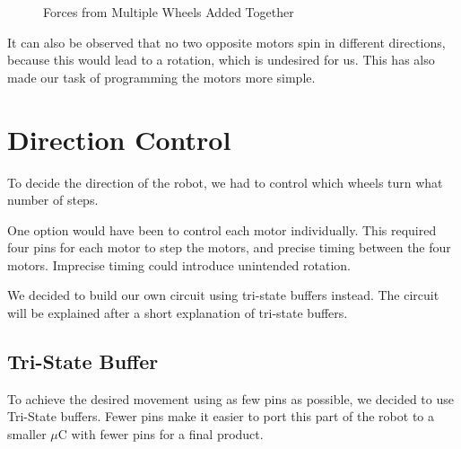 \begin{figure}[htp]
\begin{center}
{    }
	\end{center}
	\vspace{-5mm}
  	\caption{Forces from Multiple Wheels Added Together}
  	\label{fig:forces}
\end{figure}
\newpage
It can also be observed that no two opposite motors spin in different directions,
because this would lead to a rotation, which is undesired for us.
This has also made our task of programming the motors more simple.
\newpage
\section{Direction Control}\label{sec:direction}
To decide the direction of the robot, we had to control which wheels turn what number of steps. 

One option would have been to control each motor individually.
This required four pins for each motor to step the motors,
and precise timing between the four motors.
Imprecise timing could introduce unintended rotation.

We decided to build our own circuit using tri-state buffers instead.
The circuit will be explained after a short explanation of tri-state buffers.


\subsection{Tri-State Buffer}
To achieve the desired movement using as few pins as possible, we decided to use Tri-State buffers.
Fewer pins make it easier to port this part of the robot to a smaller $\mu$C with fewer pins for a 
final product.

